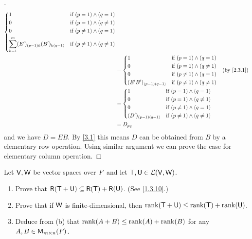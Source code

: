 \begin{proof}[]
\begin{align*}
\begin{dcases}
			     1                                                & \text{if } (p = 1) \land (q = 1)       \\
			     0                                                & \text{if } (p = 1) \land (q \neq 1)    \\
			     0                                                & \text{if } (p \neq 1) \land (q = 1)    \\
			     \sum_{k = 1}^m (E')_{(p - 1) k} (B')_{k (q - 1)} & \text{if } (p \neq 1) \land (q \neq 1)
		     \end{dcases}                        \\
		 & = \begin{dcases}
			     1                         & \text{if } (p = 1) \land (q = 1)       \\
			     0                         & \text{if } (p = 1) \land (q \neq 1)    \\
			     0                         & \text{if } (p \neq 1) \land (q = 1)    \\
			     (E' B')_{(p - 1) (q - 1)} & \text{if } (p \neq 1) \land (q \neq 1)
		     \end{dcases}                              &  & \by{2.3.1}                                               \\
		 & = \begin{dcases}
			     1                      & \text{if } (p = 1) \land (q = 1)       \\
			     0                      & \text{if } (p = 1) \land (q \neq 1)    \\
			     0                      & \text{if } (p \neq 1) \land (q = 1)    \\
			     (D')_{(p - 1) (q - 1)} & \text{if } (p \neq 1) \land (q \neq 1)
		     \end{dcases}                                                  \\
		 & = D_{p q}
	\end{align*}
	and we have \(D = EB\).
	By \cref{3.1} this means \(D\) can be obtained from \(B\) by a elementary row operation.
	Using similar argument we can prove the case for elementary column operation.
\end{proof}

\setcounter{ex}{13}
\begin{ex}\label{ex:3.2.14}
	Let \(\mathsf{V}, \mathsf{W}\) be vector spaces over \(\mathit{F}\) and let \(\mathsf{T}, \mathsf{U} \in \mathcal{L}(\mathsf{V}, \mathsf{W})\).
	\begin{enumerate}
		\item Prove that \(\rg{\T + \U} \subseteq \rg{\T} + \rg{\U}\).
		      (See \cref{1.3.10}.)
		\item Prove that if \(\mathsf{W}\) is finite-dimensional, then \(\rk{\T + \U} \leq \rk{\T} + \rk{\U}\).
		\item Deduce from (b) that \(\rk{A + B} \leq \rk{A} + \rk{B}\) for any \(A, B \in \ms\).
	\end{enumerate}
\end{ex}

